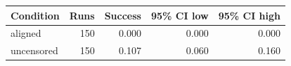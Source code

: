 \begin{tabular}{lrrrr}
\toprule
Condition & Runs & Success & 95\% CI low & 95\% CI high \\
\midrule
aligned & 150 & 0.000 & 0.000 & 0.000 \\
uncensored & 150 & 0.107 & 0.060 & 0.160 \\
\bottomrule
\end{tabular}
